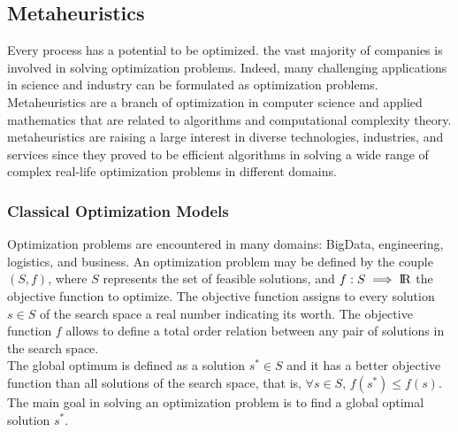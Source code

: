 \subsection{Metaheuristics}
Every process has a potential to be optimized. the vast majority of companies is involved in solving optimization problems. Indeed, many challenging applications in science and industry can be formulated as optimization problems.
Metaheuristics are a branch of optimization in computer science and applied mathematics
that are related to algorithms and computational complexity theory. metaheuristics are raising a large interest in diverse technologies, industries, and services since they proved to be efficient algorithms in solving a wide range of  complex real-life optimization problems in different domains.

\subsubsection{Classical Optimization Models}
Optimization problems are encountered in many domains: BigData, engineering, logistics, and business. An optimization problem may be defined by the couple $(S, f )$, where $S$ represents the set of feasible solutions, and $f : S \implies {\rm I\!R}$ the objective function to optimize. The objective function assigns to every solution
$s \in S$ of the search space a real number indicating its worth. The objective function
$f$ allows to define a total order relation between any pair of solutions in the search
space.\\

The global optimum is defined as  a solution $s^* \in S$ and it has a better objective function than all solutions of the search space, that is, $\forall  s \in  S$, $f(s^*) 	\leq f(s)$.\\

The main goal in solving an optimization problem is to find a global optimal solution $s^*$.

